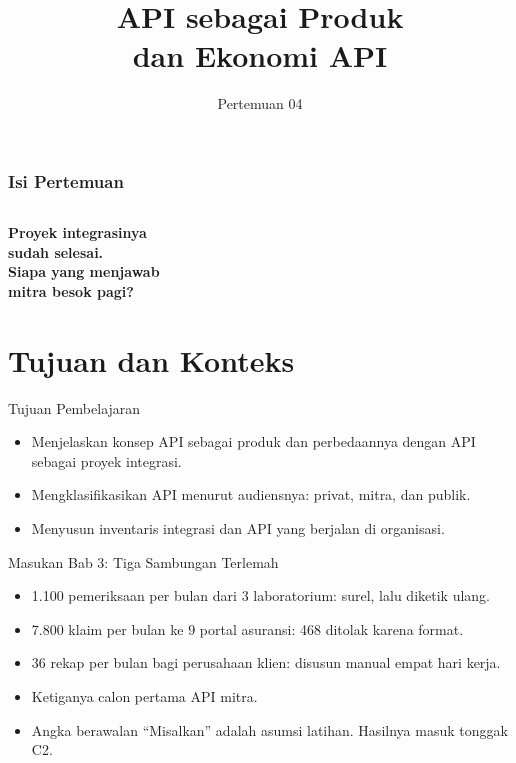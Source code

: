 \documentclass[aspectratio=169, table, 12pt]{beamer}
\title{\Huge API sebagai Produk\\ \vspace{10pt} dan Ekonomi API}
\date{Pertemuan 04}
\begin{document}
\frame{\titlepage}

\begin{frame}
  \frametitle{Isi Pertemuan}
  \vspace{14pt}
  \begin{columns}[t]
    {\small\tableofcontents[sections={1-4}]}

    {\small\tableofcontents[sections={5-9}]}
  \end{columns}
\end{frame}

\begin{frame}{\hfill}
  \centering
  \Huge{\textbf{Proyek integrasinya\\sudah selesai.\\Siapa yang menjawab\\mitra besok pagi?}}
\end{frame}

\section{Tujuan dan Konteks}

\begin{frame}{{\Large Tujuan Pembelajaran}}
  \vspace{10pt}
  \begin{itemize}
    \item Menjelaskan konsep API sebagai produk dan perbedaannya dengan API sebagai proyek integrasi.
    \item Mengklasifikasikan API menurut audiensnya: privat, mitra, dan publik.
    \item Menyusun inventaris integrasi dan API yang berjalan di organisasi.
  \end{itemize}
\end{frame}

\begin{frame}{{\Large Masukan Bab 3: Tiga Sambungan Terlemah}}
  \vspace{10pt}
  \begin{itemize}
    \item 1.100 pemeriksaan per bulan dari 3 laboratorium: surel, lalu diketik ulang.
    \item 7.800 klaim per bulan ke 9 portal asuransi: 468 ditolak karena format.
    \item 36 rekap per bulan bagi perusahaan klien: disusun manual empat hari kerja.
    \item Ketiganya calon pertama API mitra.
    \item Angka berawalan ``Misalkan'' adalah asumsi latihan. Hasilnya masuk tonggak C2.
  \end{itemize}
\end{frame}
\end{document}
